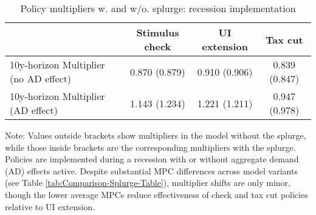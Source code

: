 \documentclass[\PathToRoot/\ProjectName]{subfiles}
\begin{document}
\begin{table}[tb] 
  \caption{Policy multipliers w. and w/o. splurge: recession implementation}
  \whenintegrated{\label{tab:Multiplier-SplurgeComp}} 
  \centering

  \begin{tabular*}
    {\textwidth}{@{\extracolsep{\fill}}lccc@{}}
    \hline
    & Stimulus check & UI extension & Tax cut \\ \hline
    10y-horizon Multiplier (no AD effect) & 0.870 (0.879) & 0.910 (0.906) & 0.839 (0.847) \\
    10y-horizon Multiplier (AD effect)    & 1.143 (1.234) & 1.221 (1.211) & 0.947 (0.978) \\
    \hline
  \end{tabular*}

  \noindent\parbox{\textwidth}{
    \medskip
    \footnotesize Note: Values outside brackets show multipliers in the model without the splurge, while those inside brackets are the corresponding multipliers with the splurge. Policies are implemented during a recession with or without aggregate demand (AD) effects active. Despite substantial MPC differences across model variants (see Table \ref{tab:Comparison-Splurge-Table}), multiplier shifts are only minor, though the lower average MPCs reduce effectiveness of check and tax cut policies relative to UI extension.
  }
\end{table}

\vspace{0.5em}

\smartbib
\end{document}
